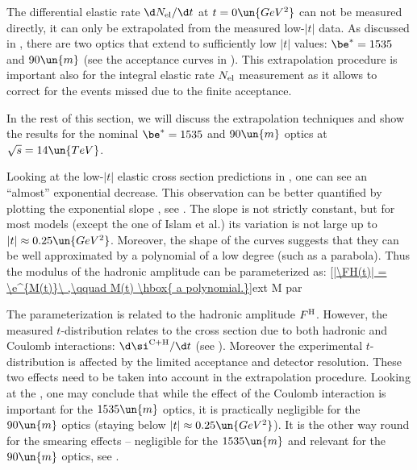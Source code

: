 The differential elastic rate $\d N_{\rm el}/\d t$ at $t=0\un{GeV^2}$ can not be measured directly, it can only be extrapolated from the measured low-$|t|$ data. As discussed in , there are two optics that extend to sufficiently low $|t|$ values: $\be^* = 1535$ and $90\un{m}$ (see the acceptance curves in ). This extrapolation procedure is important also for the integral elastic rate $N_{\rm el}$ measurement as it allows to correct for the events missed due to the finite acceptance.

In the rest of this section, we will discuss the extrapolation techniques and show the results for the nominal $\be^* = 1535$ and $90\un{m}$ optics at $\sqrt s = 14\un{TeV}$.

Looking at the low-$|t|$ elastic cross section predictions in , one can see an ``almost'' exponential decrease. This observation can be better quantified by plotting the exponential slope , see . The slope is not strictly constant, but for most models (except the one of Islam et al.) its variation is not large up to $|t| \approx 0.25\un{GeV^2}$. Moreover, the shape of the curves suggests that they can be well approximated by a polynomial of a low degree (such as a parabola). Thus the modulus of the hadronic amplitude can be parameterized as:
\eqref{|\FH(t)| = \e^{M(t)}\ ,\qquad M(t) \hbox{ a polynomial.}}{ext M par}


\bmfig
{}
\emfig

The parameterization  is related to the hadronic amplitude $F^{\rm H}$. However, the measured $t$-distribution relates to the cross section due to both hadronic and Coulomb interactions: $\d\si^{\rm C+H}/\d t$ (see ). Moreover the experimental $t$-distribution is affected by the limited acceptance and detector resolution. These two effects need to be taken into account in the extrapolation procedure. Looking at the , one may conclude that while the effect of the Coulomb interaction is important for the $1535\un{m}$ optics, it is practically negligible for the $90\un{m}$ optics (staying below $|t| \approx 0.25\un{GeV^2}$). It is the other way round for the smearing effects -- negligible for the $1535\un{m}$ and relevant for the $90\un{m}$ optics, see .

